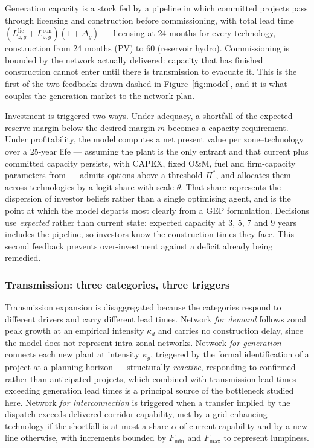 Generation capacity is a stock fed by a pipeline in which committed projects pass
through licensing and construction before commissioning, with total lead time
$(L^{\text{lic}}_{z,g} + L^{\text{con}}_{z,g})(1+\Delta_g)$ --- licensing at 24 months
for every technology, construction from 24 months (PV) to 60 (reservoir hydro).
Commissioning is bounded by the network actually delivered: capacity that has finished
construction cannot enter until there is transmission to evacuate it. This is the first
of the two feedbacks drawn dashed in Figure~\ref{fig:model}, and it is what couples the
generation market to the network plan.

Investment is triggered two ways. Under adequacy, a shortfall of the expected reserve
margin below the desired margin $\bar m$ becomes a capacity requirement. Under
profitability, the model computes a net present value per zone--technology over a
25-year life --- assuming the plant is the only entrant and that current plus committed
capacity persists, with CAPEX, fixed O\&M, fuel and firm-capacity parameters from
\citet{nrel2024} --- admits options above a threshold $\Pi^{*}$, and allocates them
across technologies by a logit share with scale $\theta$. That share represents the
dispersion of investor beliefs rather than a single optimising agent, and is the point
at which the model departs most clearly from a GEP formulation. Decisions use
\emph{expected} rather than current state: expected capacity at 3, 5, 7 and 9 years
includes the pipeline, so investors know the construction times they face. This second
feedback prevents over-investment against a deficit already being remedied.

\subsubsection{Transmission: three categories, three triggers}
\label{sec:method:trans}

Transmission expansion is disaggregated because the categories respond to different
drivers and carry different lead times. Network \emph{for demand} follows zonal peak
growth at an empirical intensity $\kappa_d$ and carries no construction delay, since
the model does not represent intra-zonal networks. Network \emph{for generation}
connects each new plant at intensity $\kappa_g$, triggered by the formal identification
of a project at a planning horizon --- structurally \emph{reactive}, responding to
confirmed rather than anticipated projects, which combined with transmission lead times
exceeding generation lead times is a principal source of the bottleneck studied here.
Network \emph{for interconnection} is triggered when a transfer implied by the dispatch
exceeds delivered corridor capability, met by a grid-enhancing technology if the
shortfall is at most a share $\alpha$ of current capability and by a new line
otherwise, with increments bounded by $F_{\min}$ and $F_{\max}$ to represent lumpiness.

